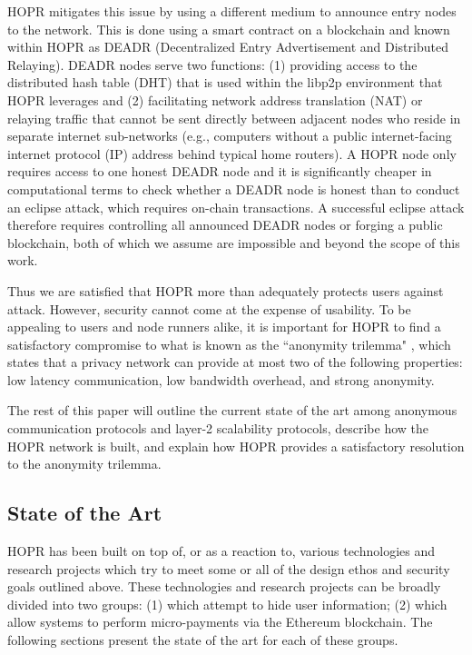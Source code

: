 HOPR mitigates this issue by using a different medium to announce entry nodes to the network. This is done using a smart contract on a blockchain and known within HOPR as DEADR (Decentralized Entry Advertisement and Distributed Relaying). DEADR nodes serve two functions: (1) providing access to the distributed hash table (DHT) that is used within the libp2p environment that HOPR leverages and (2) facilitating network address translation (NAT) or relaying traffic that cannot be sent directly between adjacent nodes who reside in separate internet sub-networks (e.g., computers without a public internet-facing internet protocol (IP) address behind typical home routers). A HOPR node only requires access to one honest DEADR node and it is significantly cheaper in computational terms to check whether a DEADR node is honest than to conduct an eclipse attack, which requires on-chain transactions. A successful eclipse attack therefore requires controlling all announced DEADR nodes or forging a public blockchain, both of which we assume are impossible and beyond the scope of this work.

Thus we are satisfied that HOPR more than adequately protects users against attack. However, security cannot come at the expense of usability. To be appealing to users and node runners alike, it is important for HOPR to find a satisfactory compromise to what is known as the ``anonymity trilemma" \cite{AnonymityTrilemma}, which states that a privacy network can provide at most two of the following properties: low latency communication, low bandwidth overhead, and strong anonymity.

The rest of this paper will outline the current state of the art among anonymous communication protocols and layer-2 scalability protocols, describe how the HOPR network is built, and explain how HOPR provides a satisfactory resolution to the anonymity trilemma.



\subsection{State of the Art}
\label{sec:stateoftheart}

HOPR has been built on top of, or as a reaction to, various technologies and research projects which try to meet some or all of the design ethos and security goals outlined above. These technologies and research projects can be broadly divided into two groups: (1)  which attempt to hide user information; (2)  which allow systems to perform micro-payments via the Ethereum blockchain. The following sections present the state of the art for each of these groups.

